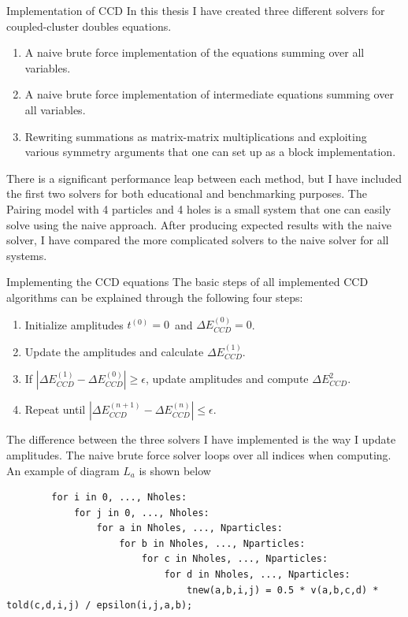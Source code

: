 \documentclass[twoside,english]{uiofysmaster}
\begin{document}
\begin{chapter}{Implementation of CCD}
	In this thesis I have created three different solvers for coupled-cluster doubles equations. 
	\begin{enumerate}
		\item A naive brute force implementation of the equations summing over all variables. 
		\item A naive brute force implementation of intermediate equations summing over all variables.
		\item Rewriting summations as matrix-matrix multiplications and exploiting various symmetry arguments that one can set up as a block implementation.
	\end{enumerate}	
	There is a significant performance leap between each method, but I have included the first two solvers for both educational and benchmarking purposes. The Pairing model with 4 particles and 4 holes is a small system that one can easily solve using the naive approach. After producing expected results with the naive solver, I have compared the more complicated solvers to the naive solver for all systems. 

	\begin{section}{Implementing the CCD equations}
		The basic steps of all implemented CCD algorithms can be explained through the following four steps:
		\begin{enumerate}
			\item Initialize amplitudes $t^{(0)} = 0$ and $\Delta E_{CCD}^{(0)} = 0$.
			\item Update the amplitudes and calculate $\Delta E_{CCD}^{(1)}$.
			\item If $ |\Delta E_{CCD}^{(1)} - \Delta E_{CCD}^{(0)}| \geq \epsilon $, update amplitudes and compute $\Delta E_{CCD}^{2}$.
			\item Repeat until $ |\Delta E_{CCD}^{(n+1)} - \Delta E_{CCD}^{(n)}| \leq \epsilon $.
		\end{enumerate}
		The difference between the three solvers I have implemented is the way I update amplitudes. The naive brute force solver loops over all indices when computing. An example of diagram $L_a$ is shown below

		\begin{lstlisting}
		for i in 0, ..., Nholes:
			for j in 0, ..., Nholes:
				for a in Nholes, ..., Nparticles:
					for b in Nholes, ..., Nparticles:
						for c in Nholes, ..., Nparticles:
							for d in Nholes, ..., Nparticles:
								tnew(a,b,i,j) = 0.5 * v(a,b,c,d) * told(c,d,i,j) / epsilon(i,j,a,b);
		\end{lstlisting}


\end{section}
\end{chapter}
\end{document}
